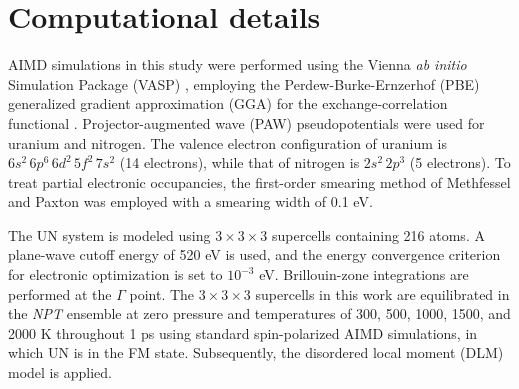 \documentclass[preprint, 12pt]{elsarticle}
\newcommand{\?}{\stackrel{?}{=}}
\begin{document}
\section{Computational details}

AIMD simulations in this study were performed using the Vienna \textit{ab initio} Simulation Package (VASP) \cite{Kresse1993, Kresse1996a, Kresse1996b}, employing the Perdew-Burke-Ernzerhof (PBE) generalized gradient approximation (GGA) for the exchange-correlation functional \cite{Perdew1996}. Projector-augmented wave (PAW) pseudopotentials were used for uranium and nitrogen. The valence electron configuration of uranium is \( 6s^2 \, 6p^6 \, 6d^2 \, 5f^2 \, 7s^2 \) (14 electrons), while that of nitrogen is \( 2s^2 \, 2p^3 \) (5 electrons). To treat partial electronic occupancies, the first-order smearing method of Methfessel and Paxton \cite{Methfessel1989} was employed with a smearing width of 0.1 eV.

The UN system is modeled using \( 3 \times 3 \times 3 \) supercells containing 216 atoms. A plane-wave cutoff energy of 520 eV is used, and the energy convergence criterion for electronic optimization is set to \( 10^{-3} \) eV. Brillouin-zone integrations are performed at the \( \Gamma \) point. The \( 3 \times 3 \times 3 \) supercells in this work are equilibrated in the \textit{NPT} ensemble at zero pressure and temperatures of 300, 500, 1000, 1500, and 2000 K throughout 1 ps using standard spin-polarized AIMD simulations, in which UN is in the FM state. Subsequently, the disordered local moment (DLM) model is applied.
\end{document}
